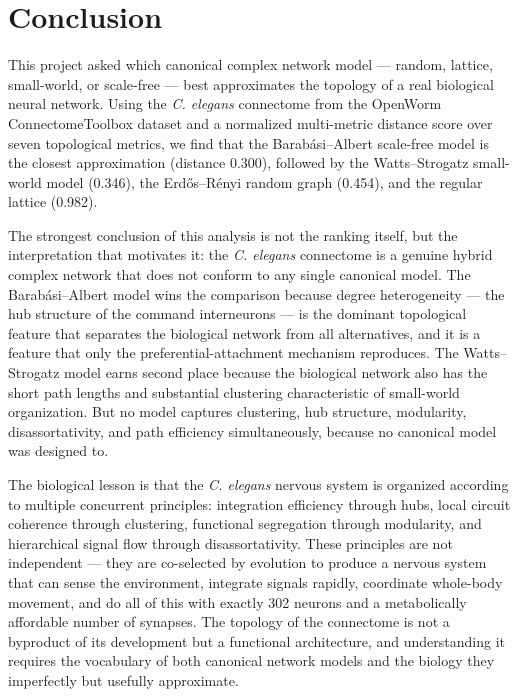 \documentclass[12pt,a4paper]{report}
\begin{document}
\chapter{Conclusion}

This project asked which canonical complex network model — random, lattice, small-world, or scale-free — best approximates the topology of a real biological neural network. Using the \textit{C. elegans} connectome from the OpenWorm ConnectomeToolbox dataset and a normalized multi-metric distance score over seven topological metrics, we find that the Barab\'{a}si--Albert scale-free model is the closest approximation (distance 0.300), followed by the Watts--Strogatz small-world model (0.346), the Erd\H{o}s--R\'{e}nyi random graph (0.454), and the regular lattice (0.982).

The strongest conclusion of this analysis is not the ranking itself, but the interpretation that motivates it: the \textit{C. elegans} connectome is a genuine hybrid complex network that does not conform to any single canonical model. The Barab\'{a}si--Albert model wins the comparison because degree heterogeneity — the hub structure of the command interneurons — is the dominant topological feature that separates the biological network from all alternatives, and it is a feature that only the preferential-attachment mechanism reproduces. The Watts--Strogatz model earns second place because the biological network also has the short path lengths and substantial clustering characteristic of small-world organization. But no model captures clustering, hub structure, modularity, disassortativity, and path efficiency simultaneously, because no canonical model was designed to.

The biological lesson is that the \textit{C. elegans} nervous system is organized according to multiple concurrent principles: integration efficiency through hubs, local circuit coherence through clustering, functional segregation through modularity, and hierarchical signal flow through disassortativity. These principles are not independent — they are co-selected by evolution to produce a nervous system that can sense the environment, integrate signals rapidly, coordinate whole-body movement, and do all of this with exactly 302 neurons and a metabolically affordable number of synapses. The topology of the connectome is not a byproduct of its development but a functional architecture, and understanding it requires the vocabulary of both canonical network models and the biology they imperfectly but usefully approximate.
\end{document}
